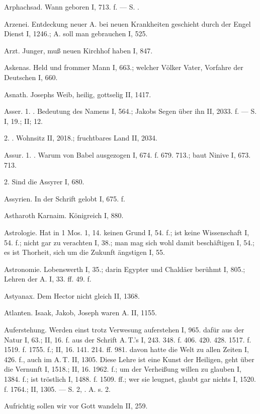 Arphachsad. Wann geboren I, 713. f. — S. .

Arzenei. Entdeckung neuer A. bei neuen Krankheiten geschieht durch der Engel Dienst I, 1246.; A. soll man gebrauchen I, 525.

Arzt. Junger, muß neuen Kirchhof haben I, 847.

Askenas. Held und frommer Mann I, 663.; welcher Völker Vater, Vorfahre der Deutschen I, 660.

Asnath. Josephs Weib, heilig, gottselig II, 1417.

Asser. 1. . Bedeutung des Namens I, 564.; Jakobs Segen über ihn II, 2033. f. — S.  I, 19.; II;  12.

2. . Wohnsitz II, 2018.; fruchtbares Land II, 2034.

Assur. 1. . Warum von Babel ausgezogen I, 674. f. 679. 713.; baut Ninive I, 673. 713.

2. Sind die Assyrer I, 680.

Assyrien. In der Schrift gelobt I, 675. f.

Astharoth Karnaim. Königreich I, 880.

Astrologie. Hat in 1 Mos. 1, 14. keinen Grund I, 54. f.; ist keine Wissenschaft I, 54. f.; nicht gar zu verachten I, 38.; man mag sich wohl damit beschäftigen I, 54.; es ist Thorheit, sich um die Zukunft ängstigen I, 55.

Astronomie. Lobenswerth I, 35.; darin Egypter und Chaldäer berühmt I, 805.; Lehren der A. I, 33. ff. 49. f.

Astyanax. Dem Hector nicht gleich II, 1368.

Atlanten. Isaak, Jakob, Joseph waren A. II, 1155.

Auferstehung. Werden einst trotz Verwesung auferstehen I, 965.  dafür aus der Natur I, 63.; II, 16. f. aus der Schrift A.\,T.’s I, 243. 348. f. 406. 420. 428. 1517. f. 1519. f. 1755. f.; II, 16. 141. 214. ff. 981.  davon hatte die Welt zu allen Zeiten I, 426. f., auch im A.\,T. II, 1305. Diese Lehre ist eine Kunst der Heiligen, geht über die Vernunft I, 1518.; II, 16. 1962. f.; um der Verheißung willen zu glauben I, 1384. f.; ist tröstlich I, 1488. f. 1509. ff.; wer sie leugnet, glaubt gar nichts I, 1520. f. 1764.; II, 1305. — S.  2, .  A. s.  2.

Aufrichtig sollen wir vor Gott wandeln II, 259.

